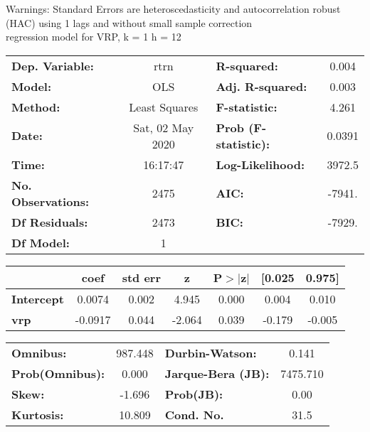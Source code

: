Warnings: \newline
 [1] Standard Errors are heteroscedasticity and autocorrelation robust (HAC) using 1 lags and without small sample correction\\ 

regression model for VRP, k = 1 h = 12\begin{center}
\begin{tabular}{lclc}
\toprule
\textbf{Dep. Variable:}    &       rtrn       & \textbf{  R-squared:         } &     0.004   \\
\textbf{Model:}            &       OLS        & \textbf{  Adj. R-squared:    } &     0.003   \\
\textbf{Method:}           &  Least Squares   & \textbf{  F-statistic:       } &     4.261   \\
\textbf{Date:}             & Sat, 02 May 2020 & \textbf{  Prob (F-statistic):} &   0.0391    \\
\textbf{Time:}             &     16:17:47     & \textbf{  Log-Likelihood:    } &    3972.5   \\
\textbf{No. Observations:} &        2475      & \textbf{  AIC:               } &    -7941.   \\
\textbf{Df Residuals:}     &        2473      & \textbf{  BIC:               } &    -7929.   \\
\textbf{Df Model:}         &           1      & \textbf{                     } &             \\
\bottomrule
\end{tabular}
\begin{tabular}{lcccccc}
                   & \textbf{coef} & \textbf{std err} & \textbf{z} & \textbf{P$> |$z$|$} & \textbf{[0.025} & \textbf{0.975]}  \\
\midrule
\textbf{Intercept} &       0.0074  &        0.002     &     4.945  &         0.000        &        0.004    &        0.010     \\
\textbf{vrp}       &      -0.0917  &        0.044     &    -2.064  &         0.039        &       -0.179    &       -0.005     \\
\bottomrule
\end{tabular}
\begin{tabular}{lclc}
\textbf{Omnibus:}       & 987.448 & \textbf{  Durbin-Watson:     } &    0.141  \\
\textbf{Prob(Omnibus):} &   0.000 & \textbf{  Jarque-Bera (JB):  } & 7475.710  \\
\textbf{Skew:}          &  -1.696 & \textbf{  Prob(JB):          } &     0.00  \\
\textbf{Kurtosis:}      &  10.809 & \textbf{  Cond. No.          } &     31.5  \\
\bottomrule
\end{tabular}
\end{center}

